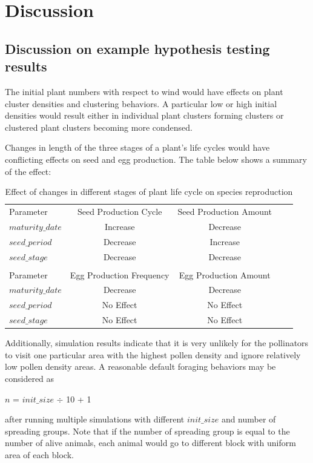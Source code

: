 \documentclass[3p,,preprint,12pt]{elsarticle}
\begin{document}
\section{Discussion}
\subsection{Discussion on example hypothesis testing results}

The initial plant numbers with respect to wind would have effects on plant cluster densities and clustering behaviors. A particular low or high initial densities would result either in individual plant clusters forming clusters or clustered plant clusters becoming more condensed. 

Changes in length of the three stages of a plant's life cycles would have conflicting effects on seed and egg production. The table below shows a summary of the effect:
    \begin{table}[!htb]
    \begin{center}
    \begin{tabular}{ l c c c c }
    Parameter & Seed Production Cycle & Seed Production Amount \\
    $maturity\_date$ & Increase & Decrease\\
    $seed\_period$ & Decrease & Increase\\
    $seed\_stage$ & Decrease & Decrease\\
    &&\\
    Parameter & Egg Production Frequency & Egg Production Amount \\
    $maturity\_date$ & Decrease & Decrease \\
    $seed\_period$ & No Effect & No Effect \\
    $seed\_stage$ & No Effect & No Effect \\
    \end{tabular}
    \caption{\label{tab:table-name} Effect of changes in different stages of plant life cycle on species reproduction}
    \end{center}
    \end{table}

Additionally, simulation results indicate that it is very unlikely for the pollinators to visit one particular area with the highest pollen density and ignore relatively low pollen density areas. A reasonable default foraging behaviors may be considered as 
        \begin{center}
        $n$ = $init\_size$ $\div$ 10 + 1
        \end{center}
after running multiple simulations with different $init\_size$ and number of spreading groups. Note that if the number of spreading group is equal to the number of alive animals, each animal would go to different block with uniform area of each block. 
\end{document}
